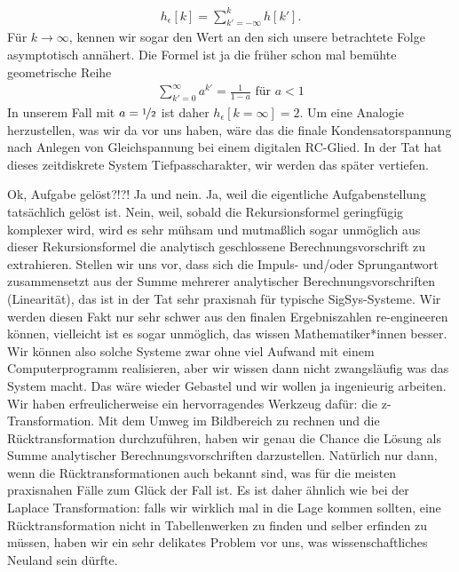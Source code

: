 \begin{Ansatz}
\begin{align}
h_\epsilon[k] = \sum_{k'=-\infty}^{k} h[k'].
\end{align}
%
Für $k \to \infty$, kennen wir sogar den Wert an den sich unsere betrachtete Folge
asymptotisch annähert. Die Formel ist ja die früher schon mal bemühte
geometrische Reihe
\begin{align}
\sum_{k'=0}^{\infty} a^{k'} = \frac{1}{1-a}\text{ für } a<1
\end{align}
In unserem Fall mit $a=\nicefrac{1}{2}$ ist daher $h_\epsilon[k=\infty] = 2$.
Um eine Analogie
herzustellen, was wir da vor uns haben, wäre das die finale Kondensatorspannung
nach Anlegen von Gleichspannung bei einem digitalen RC-Glied. In der Tat hat
dieses zeitdiskrete System Tiefpasscharakter, wir werden das später vertiefen.

Ok, Aufgabe gelöst?!?! Ja und nein. Ja, weil die eigentliche Aufgabenstellung
tatsächlich gelöst ist. Nein, weil, sobald die Rekursionsformel geringfügig
komplexer wird, wird es sehr mühsam und mutmaßlich sogar unmöglich aus dieser
Rekursionsformel die analytisch geschlossene Berechnungsvorschrift zu extrahieren.
Stellen wir uns vor, dass sich die Impuls- und/oder Sprungantwort zusammensetzt
aus der Summe mehrerer analytischer Berechnungsvorschriften (Linearität),
das ist in der Tat sehr praxisnah für typische SigSys-Systeme. Wir werden diesen
Fakt nur sehr schwer aus den finalen Ergebniszahlen re-engineeren können, vielleicht
ist es sogar unmöglich, das wissen Mathematiker*innen besser.
Wir können also solche Systeme zwar ohne viel Aufwand mit einem Computerprogramm
realisieren, aber wir wissen dann nicht zwangsläufig was das System macht.
Das wäre wieder Gebastel und wir wollen ja ingenieurig arbeiten.
%
Wir haben erfreulicherweise ein hervorragendes Werkzeug dafür: die z-Transformation.
Mit dem Umweg im Bildbereich zu rechnen und die Rücktransformation durchzuführen,
haben wir genau die Chance die Lösung als Summe analytischer Berechnungsvorschriften
darzustellen. Natürlich nur dann, wenn die Rücktransformationen auch bekannt sind,
was für die meisten praxisnahen Fälle zum Glück der Fall ist. Es ist daher ähnlich
wie bei der Laplace Transformation: falls wir wirklich mal in die Lage kommen
sollten, eine Rücktransformation nicht in Tabellenwerken zu finden und selber
erfinden zu müssen, haben wir ein sehr delikates Problem vor uns, was
wissenschaftliches Neuland sein dürfte.
\end{Ansatz}
